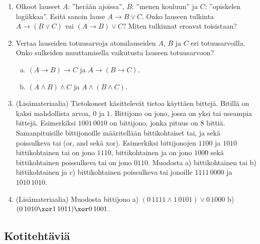 \begin{enumerate}
\item Olkoot lauseet $A$: ''herään ajoissa'', $B$: ''menen kouluun'' ja $C$: ''opiskelen logiikkaa''.
Esitä sanoin lause $A \to B \lor C$. Onko lauseen tulkinta $A \to (B \lor C)$ vai $(A \to B) \lor C$? Miten tulkinnat eroavat toisistaan? 

\item
Vertaa lauseiden totuusarvoja atomilauseiden $A$, $B$ ja $C$ eri totuusarvoilla. Onko sulkeiden muuttamisella vaikutusta lauseen totuusarvoon?
\begin{enumerate}[a)]
\item $(A\to B)\to C$ ja $A\to (B\to C)$.
\item $(A\land B)\land C$ ja $A\land (B\land C)$.
\end{enumerate}

\item (Lisämateriaalia)  Tietokoneet käsittelevät tietoa käyttäen bittejä. Bitillä on kaksi mahdollista arvoa, $0$ ja $1$.
Bittijono on jono, jossa on yksi tai useampia bittejä. Esimerkiksi $1001\, 0010$ on bittijono, jonka pituus on $8$ bittiä. Samanpituisille bittijonoille määritellään bittikohtaiset tai, ja sekä poissulkeva tai (or, and sekä xor). Esimerkiksi bittijonojen $1100$ ja $1010$ bittikohtainen tai on jono $1110$, bittikohtainen ja on jono $1000$ sekä bittikohtainen poissulkeva tai on jono $0110$. Muodosta a) bittikohtainen tai  b) bittikohtainen ja c) bittikohtainen poissulkeva tai jonoille $1111\, 0000$ ja $1010\, 1010$.

\item (Lisämateriaalia)  Muodosta bittijono a)  $(0\, 1111 \land 1\, 0101) \lor 0\, 1000$  b) $(0\, 1010 \xor 1\, 1011) \xor 0\, 1001$. 

\end{enumerate}

\subsection*{Kotitehtäviä}

